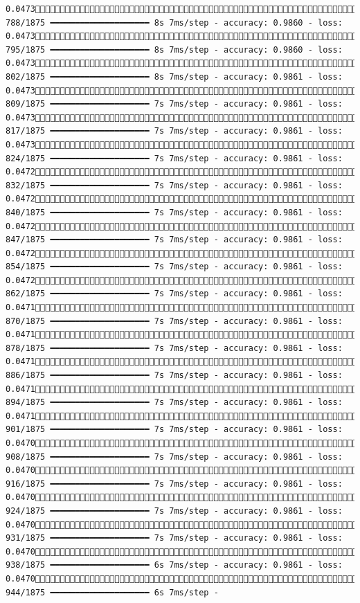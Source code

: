 \documentclass[
  letterpaper,
  DIV=11,
  numbers=noendperiod]{scrreprt}
\begin{document}
\begin{verbatim}
0.0473 788/1875 ━━━━━━━━━━━━━━━━━━━━ 8s 7ms/step - accuracy: 0.9860 - loss: 0.0473 795/1875 ━━━━━━━━━━━━━━━━━━━━ 8s 7ms/step - accuracy: 0.9860 - loss: 0.0473 802/1875 ━━━━━━━━━━━━━━━━━━━━ 8s 7ms/step - accuracy: 0.9861 - loss: 0.0473 809/1875 ━━━━━━━━━━━━━━━━━━━━ 7s 7ms/step - accuracy: 0.9861 - loss: 0.0473 817/1875 ━━━━━━━━━━━━━━━━━━━━ 7s 7ms/step - accuracy: 0.9861 - loss: 0.0473 824/1875 ━━━━━━━━━━━━━━━━━━━━ 7s 7ms/step - accuracy: 0.9861 - loss: 0.0472 832/1875 ━━━━━━━━━━━━━━━━━━━━ 7s 7ms/step - accuracy: 0.9861 - loss: 0.0472 840/1875 ━━━━━━━━━━━━━━━━━━━━ 7s 7ms/step - accuracy: 0.9861 - loss: 0.0472 847/1875 ━━━━━━━━━━━━━━━━━━━━ 7s 7ms/step - accuracy: 0.9861 - loss: 0.0472 854/1875 ━━━━━━━━━━━━━━━━━━━━ 7s 7ms/step - accuracy: 0.9861 - loss: 0.0472 862/1875 ━━━━━━━━━━━━━━━━━━━━ 7s 7ms/step - accuracy: 0.9861 - loss: 0.0471 870/1875 ━━━━━━━━━━━━━━━━━━━━ 7s 7ms/step - accuracy: 0.9861 - loss: 0.0471 878/1875 ━━━━━━━━━━━━━━━━━━━━ 7s 7ms/step - accuracy: 0.9861 - loss: 0.0471 886/1875 ━━━━━━━━━━━━━━━━━━━━ 7s 7ms/step - accuracy: 0.9861 - loss: 0.0471 894/1875 ━━━━━━━━━━━━━━━━━━━━ 7s 7ms/step - accuracy: 0.9861 - loss: 0.0471 901/1875 ━━━━━━━━━━━━━━━━━━━━ 7s 7ms/step - accuracy: 0.9861 - loss: 0.0470 908/1875 ━━━━━━━━━━━━━━━━━━━━ 7s 7ms/step - accuracy: 0.9861 - loss: 0.0470 916/1875 ━━━━━━━━━━━━━━━━━━━━ 7s 7ms/step - accuracy: 0.9861 - loss: 0.0470 924/1875 ━━━━━━━━━━━━━━━━━━━━ 7s 7ms/step - accuracy: 0.9861 - loss: 0.0470 931/1875 ━━━━━━━━━━━━━━━━━━━━ 7s 7ms/step - accuracy: 0.9861 - loss: 0.0470 938/1875 ━━━━━━━━━━━━━━━━━━━━ 6s 7ms/step - accuracy: 0.9861 - loss: 0.0470 944/1875 ━━━━━━━━━━━━━━━━━━━━ 6s 7ms/step - 
\end{verbatim}
\end{document}
